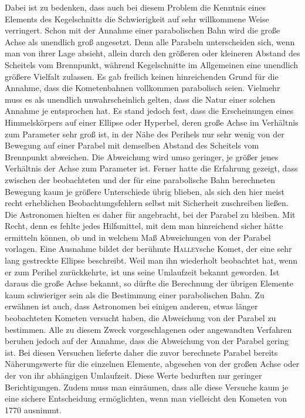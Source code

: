 Dabei ist zu bedenken, dass auch bei diesem Problem die Kenntnis eines Elements des Kegelschnitts die Schwierigkeit auf sehr willkommene Weise verringert. Schon mit der Annahme einer parabolischen Bahn wird die große Achse als unendlich groß angesetzt. Denn alle Parabeln unterscheiden sich, wenn man von ihrer Lage absieht, allein durch den größeren oder kleineren Abstand des Scheitels vom Brennpunkt, während Kegelschnitte im Allgemeinen eine unendlich größere Vielfalt zulassen. Es gab freilich keinen hinreichenden Grund für die Annahme, dass die Kometenbahnen vollkommen parabolisch seien. Vielmehr muss es als unendlich unwahrscheinlich gelten, dass die Natur einer solchen Annahme je entsprochen hat. Es stand jedoch fest, dass die Erscheinungen eines Himmelskörpers auf einer Ellipse oder Hyperbel, deren große Achse im Verhältnis zum Parameter sehr groß ist, in der Nähe des Perihels nur sehr wenig von der Bewegung auf einer Parabel mit demselben Abstand des Scheitels vom Brennpunkt abweichen. Die Abweichung wird umso geringer, je größer jenes Verhältnis der Achse zum Parameter ist. Ferner hatte die Erfahrung gezeigt, dass zwischen der beobachteten und der für eine parabolische Bahn berechneten Bewegung kaum je größere Unterschiede übrig blieben, als sich den hier meist recht erheblichen Beobachtungsfehlern selbst mit Sicherheit zuschreiben ließen. Die Astronomen hielten es daher für angebracht, bei der Parabel zu bleiben. Mit Recht, denn es fehlte jedes Hilfsmittel, mit dem man hinreichend sicher hätte ermitteln können, ob und in welchem Maß Abweichungen von der Parabel vorlagen. Eine Ausnahme bildet der berühmte \textsc{Halley}sche Komet, der eine sehr lang gestreckte Ellipse beschreibt. Weil man ihn wiederholt beobachtet hat, wenn er
zum Perihel zurückkehrte, ist uns seine Umlaufzeit bekannt geworden. Ist daraus die große Achse bekannt, so dürfte die Berechnung der übrigen Elemente kaum schwieriger sein als die Bestimmung einer parabolischen Bahn. Zu erwähnen ist auch, dass Astronomen bei einigen anderen, etwas länger beobachteten Kometen versucht haben, die Abweichung von der Parabel zu bestimmen. Alle zu diesem Zweck vorgeschlagenen oder angewandten Verfahren beruhen jedoch auf der Annahme, dass die Abweichung von der Parabel gering ist. Bei diesen Versuchen lieferte daher die zuvor berechnete Parabel bereits Näherungswerte für die einzelnen Elemente, abgesehen von der großen Achse oder der von ihr abhängigen Umlaufzeit. Diese Werte bedurften nur geringer Berichtigungen. Zudem muss man einräumen, dass alle diese Versuche kaum je eine sichere Entscheidung ermöglichten, wenn man vielleicht den Kometen von 1770 ausnimmt.

